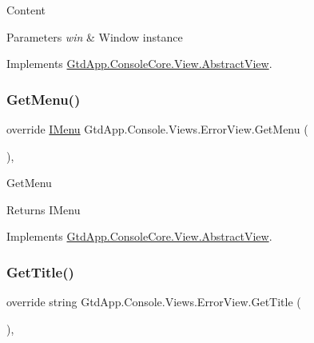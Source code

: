 Content 


\begin{DoxyParams}{Parameters}
{\em win} & Window instance\\
\hline
\end{DoxyParams}


Implements \mbox{\hyperlink{class_gtd_app_1_1_console_core_1_1_view_1_1_abstract_view_a8c518373e635d19875713f2b9f2e1592}{Gtd\+App.\+Console\+Core.\+View.\+Abstract\+View}}.

\mbox{\label{class_gtd_app_1_1_console_1_1_views_1_1_error_view_a6073e05c80db775ba86986c8a068df87}} 
\subsubsection{\texorpdfstring{Get\+Menu()}{GetMenu()}}
{\footnotesize\ttfamily override \mbox{\hyperlink{interface_gtd_app_1_1_console_core_1_1_menu_1_1_i_menu}{I\+Menu}} Gtd\+App.\+Console.\+Views.\+Error\+View.\+Get\+Menu (\begin{DoxyParamCaption}{ }\end{DoxyParamCaption})\hspace{0.3cm}{\ttfamily [protected]}, {\ttfamily [virtual]}}



Get\+Menu 

\begin{DoxyReturn}{Returns}
I\+Menu
\end{DoxyReturn}


Implements \mbox{\hyperlink{class_gtd_app_1_1_console_core_1_1_view_1_1_abstract_view_a04360e549fc462f357300c59fa7fadab}{Gtd\+App.\+Console\+Core.\+View.\+Abstract\+View}}.

\mbox{\label{class_gtd_app_1_1_console_1_1_views_1_1_error_view_a877430d97de101a08a4d0894ccaf41c0}} 
\subsubsection{\texorpdfstring{Get\+Title()}{GetTitle()}}
{\footnotesize\ttfamily override string Gtd\+App.\+Console.\+Views.\+Error\+View.\+Get\+Title (\begin{DoxyParamCaption}{ }\end{DoxyParamCaption})\hspace{0.3cm}{\ttfamily [protected]}, {\ttfamily [virtual]}}



